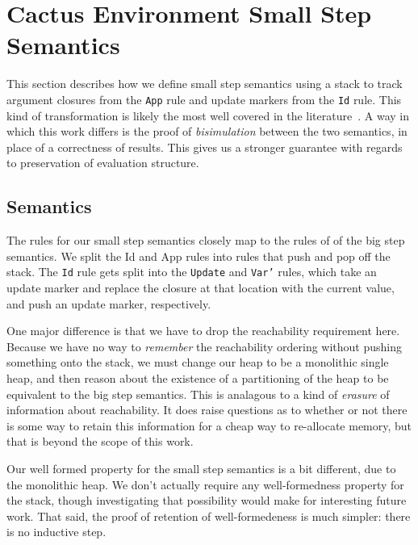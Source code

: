 \section{Cactus Environment Small Step Semantics}

This section describes how we define small step semantics using a stack to track
argument closures from the \texttt{App} rule and update markers from the
\texttt{Id} rule. This kind of transformation is likely the most well covered in
the literature~\cite{?}. A way in which this work differs is the proof of
\emph{bisimulation} between the two semantics, in place of a correctness of
results. This gives us a stronger guarantee with regards to preservation of
evaluation structure.

\subsection{Semantics}

The rules for our small step semantics closely map to the rules of of the big
step semantics. We split the Id and App rules into rules that push and pop off
the stack. The \texttt{Id} rule gets split into the \texttt{Update} and
\texttt{Var'} rules, which take an update marker and replace the closure at that
location with the current value, and push an update marker, respectively. 

One major difference is that we have to drop the reachability requirement here.
Because we have no way to \emph{remember} the reachability ordering without
pushing something onto the stack, we must change our heap to be a monolithic
single heap, and then reason about the existence of a partitioning of the heap
to be equivalent to the big step semantics. This is analagous to a kind of
\emph{erasure} of information about reachability. It does raise questions as to
whether or not there is some way to retain this information for a cheap way to
re-allocate memory, but that is beyond the scope of this work.

Our well formed property for the small step semantics is a bit different, due to
the monolithic heap. We don't actually require any well-formedness property for
the stack, though investigating that possibility would make for interesting
future work. That said, the proof of retention of well-formedeness is much
simpler: there is no inductive step.   

